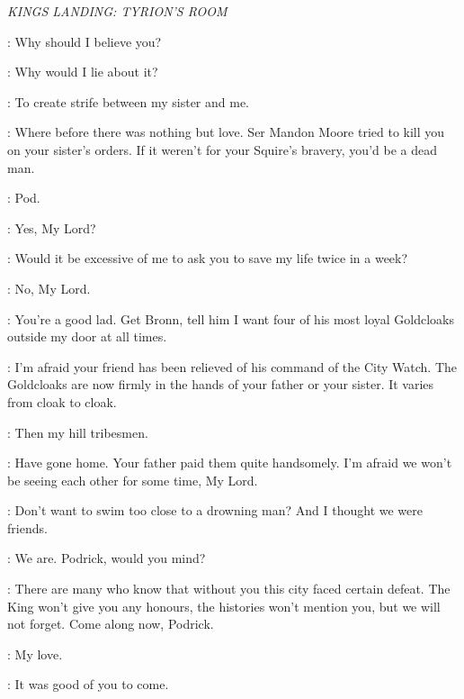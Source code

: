 \textit{KINGS LANDING: TYRION'S ROOM} 


\TYRION: Why should I believe you? 

\VARYS: Why would I lie about it? 

\TYRION: To create strife between my sister and me. 

\VARYS: Where before there was nothing but love. Ser Mandon Moore tried to kill you on your sister's orders. If it weren't for your Squire's bravery, you'd be a dead man. 

\TYRION: Pod. 

\PODRICK: Yes, My Lord? 

\TYRION: Would it be excessive of me to ask you to save my life twice in a week? 

\PODRICK: No, My Lord. 

\TYRION: You're a good lad. Get Bronn, tell him I want four of his most loyal Goldcloaks outside my door at all times. 


\VARYS: I'm afraid your friend has been relieved of his command of the City Watch. The Goldcloaks are now firmly in the hands of your father or your sister. It varies from cloak to cloak. 

\TYRION: Then my hill tribesmen. 


\VARYS: Have gone home. Your father paid them quite handsomely. I'm afraid we won't be seeing each other for some time, My Lord. 

\TYRION: Don't want to swim too close to a drowning man? And I thought we were friends. 

\VARYS: We are. Podrick, would you mind? 

 
\VARYS:  There are many who know that without you this city faced certain defeat. The King won't give you any honours, the histories won't mention you, but we will not forget. Come along now, Podrick. 


\SHAE: My love. 

\TYRION: It was good of you to come. 


